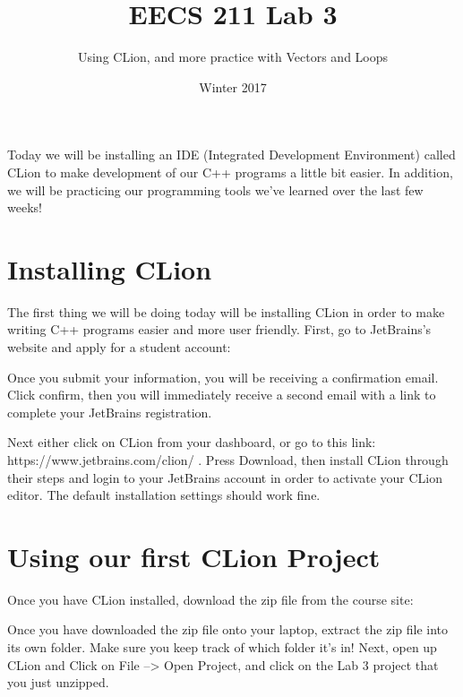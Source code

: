 \documentclass{tufte-handout}
\title{EECS 211 Lab 3}
\author{Using CLion, and more practice with Vectors and Loops}
\date{Winter 2017}
\begin{document}
\maketitle

Today we will be installing an IDE (Integrated Development Environment) called CLion to make development of our C++ programs a little bit easier.  In addition, we will be practicing our programming tools we've learned over the last few weeks!

\section{Installing CLion}
The first thing we will be doing today will be installing CLion in order to make writing C++ programs easier and more user friendly.  First, go to JetBrains's website and apply for a student account: \medskip

 \medskip

Once you submit your information, you will be receiving a confirmation email.  Click confirm, then you will immediately receive a second email with a link to complete your JetBrains registration.

Next either click on CLion from your dashboard, or go to this link: https://www.jetbrains.com/clion/ .  Press Download, then install CLion through their steps and login to your JetBrains account in order to activate your CLion editor. The default installation settings should work fine.   

\section{Using our first CLion Project}
Once you have CLion installed, download the zip file from the course site: \medskip

 \medskip

Once you have downloaded the zip file onto your laptop, extract the zip file into its own folder. Make sure you keep track of which folder it's in!  Next, open up CLion and Click on File --> Open Project, and click on the Lab 3 project that you just unzipped. 
\end{document}
